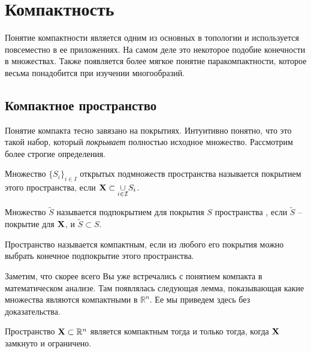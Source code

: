 \section{Компактность}
\begin{Intro}
 Понятие компактности является одним из основных в топологии и используется повсеместно в ее приложениях. На самом деле это некоторое подобие конечности в множествах. Также появляется более мягкое понятие паракомпактности, которое весьма понадобится при изучении многообразий.
\end{Intro}

\subsection{Компактное пространство}
Понятие компакта тесно завязано на покрытиях. Интуитивно понятно, что это такой набор, который \textit{покрывает} полностью исходное множество. Рассмотрим более строгие определения.
\begin{Def}
     [Покрытие]
     Множество $\{S_i\}_{i\in I}$ открытых подмножеств пространства \topX называется покрытием этого пространства, если $\mathbf{X} \subset \underset{\tiny i\in\mathcal{I}}{\cup} S_i$.
\end{Def}
\begin{Def}
    [Подпокрытие]
    Множество $\tilde{S}$ называется подпокрытием для покрытия $S$ пространства \topX, если $\tilde{S}$ -- покрытие для $\mathbf{X}$, и $\tilde{S} \subset S$.
\end{Def}
\begin{Def}
    Пространство \topX называется компактным, если из любого его покрытия можно выбрать конечное подпокрытие этого пространства.
\end{Def}
\begin{Note}
    Заметим, что скорее всего Вы уже встречались с понятием компакта в математическом анализе. Там появлялась следующая лемма, показывающая какие множества являются компактными в $\mathbb{R}^n$. Ее мы приведем здесь без доказательства.
\end{Note}
\begin{Lem}
    Пространство $\mathbf{X} \subset \mathbb{R}^n$ является компактным тогда и только тогда, когда  $\mathbf{X}$ замкнуто и ограничено.
\end{Lem}

